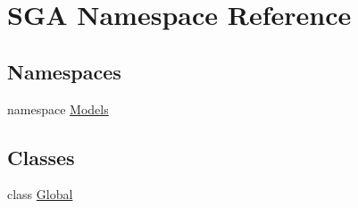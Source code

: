 \hypertarget{namespace_s_g_a}{}\section{S\+GA Namespace Reference}
\label{namespace_s_g_a}
\subsection*{Namespaces}
\begin{DoxyCompactItemize}
\item 
namespace \hyperlink{namespace_s_g_a_1_1_models}{Models}
\end{DoxyCompactItemize}
\subsection*{Classes}
\begin{DoxyCompactItemize}
\item 
class \hyperlink{class_s_g_a_1_1_global}{Global}
\end{DoxyCompactItemize}
